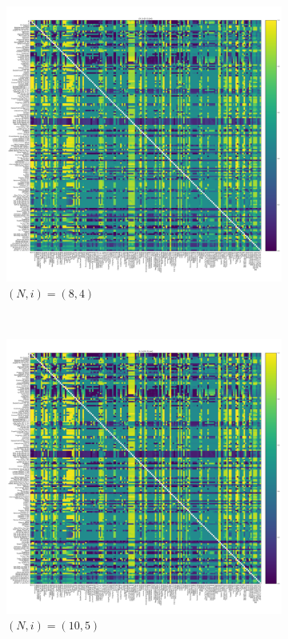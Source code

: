 \documentclass{article}
\begin{document}
\begin{figure}[!hbtp]
    \begin{subfigure}[t]{.3\textwidth}
        \centering
        \includegraphics[width=.8\textwidth]{../img/fixation_heatmap_8_4_std.pdf}
        \caption{\((N,i)=(8, 4)\)}
    \end{subfigure}%
    ~
    \begin{subfigure}[t]{.3\textwidth}
        \centering
        \includegraphics[width=.8\textwidth]{../img/fixation_heatmap_10_5_std.pdf}
        \caption{\((N,i)=(10, 5)\)}
    \end{subfigure}%
    ~
    \begin{subfigure}[t]{.3\textwidth}

\end{subfigure}
\end{figure}
\end{document}
